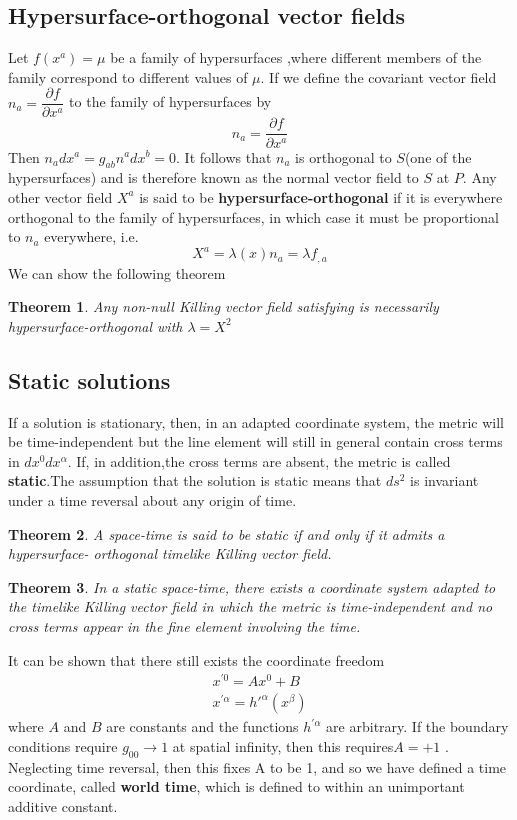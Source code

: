 \documentclass[12pt,a4paper]{article}
\numberwithin{table}{section}
\numberwithin{figure}{section}
\numberwithin{equation}{section}
\newtheorem{theorem}{Theorem}[section]
\theoremstyle{remark}
\theoremstyle{definition}
\begin{document}
\subsection*{Hypersurface-orthogonal vector fields}
Let $f(x^a)=\mu$ be a family of hypersurfaces ,where different members of the family correspond to different values of $\mu$. If we define the covariant vector field $n_a=\dfrac{\partial f}{\partial x^a}$ to the family of hypersurfaces by 
\begin{equation}
    n_a=\dfrac{\partial f}{\partial x^a}
\end{equation}
Then $n_adx^a=g_{ab}n^adx^b=0$. It follows that $n_a$ is orthogonal to $S$(one of the hypersurfaces) and is therefore known as the normal vector field to $S$ at $P$. Any other vector field $X^a$ is said to be \textbf{hypersurface-orthogonal} if it is everywhere orthogonal to the family of hypersurfaces, in which case it must be proportional to $n_a$ everywhere, i.e.
\begin{equation}
    X^a=\lambda(x)n_a=\lambda f_{,a}
\end{equation}
We can show the following theorem
\begin{theorem}
Any non-null Killing vector field satisfying is necessarily hypersurface-orthogonal with $\lambda=X^2$
\end{theorem}
\subsection*{Static solutions}
If a solution is stationary, then, in an adapted coordinate system, the metric 
will be time-independent but the line element will still in general contain cross terms in $dx^0dx^\alpha$. If, in addition,the cross terms are absent, the metric is called \textbf{static}.The assumption that the solution is static means that $ds^2$ is invariant under a time reversal about any origin of time.
\begin{theorem}
A space-time is said to be static if and only if it admits a hypersurface- 
orthogonal timelike Killing vector field.
\end{theorem}
\begin{theorem}
In a static space-time, there exists a coordinate system adapted to the 
timelike Killing vector field in which the metric is time-independent and no cross terms appear in the fine element involving the time.
\end{theorem}
It can be shown that there still exists the coordinate freedom
\begin{align*}
    x^{'0}=Ax^0+B\\
    x^{'\alpha}=h'^\alpha(x^\beta)
\end{align*}
where $A$ and $B$ are constants and the functions $h^{'\alpha}$ are arbitrary. If the boundary conditions require $g_{00}\rightarrow1$ at spatial infinity, then this requires$A = +1$ . Neglecting time reversal, then this fixes A to be 1, and so we have defined a time coordinate, called \textbf{world time}, which is defined to within an unimportant additive constant. 
\end{document}
